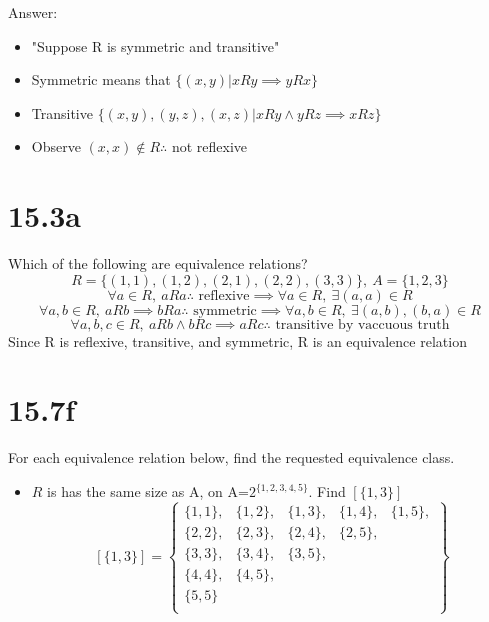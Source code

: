\documentclass[11pt]{article}
\theoremstyle{plain}
\begin{document}
Answer:
\begin{itemize}
    \item "Suppose R is symmetric and transitive"
    \item Symmetric means that $\{(x,y) | xRy \implies yRx\}$ 
    \item Transitive $\{(x,y), (y,z), (x,z) | xRy \land yRz \implies xRz\}$
    \item Observe $(x,x) \not\in R \therefore$ not reflexive
\end{itemize}

\section{15.3a}
Which of the following are equivalence relations?
$$R = \{(1,1),(1,2),(2,1),(2,2),(3,3)\}, ~A = \{1,2,3\}$$
    $$\forall a \in R, ~aRa \therefore \text{ reflexive} \implies \forall a \in R, ~\exists (a,a) \in R $$
    $$\forall a,b \in R, ~aRb \implies bRa \therefore \text{ symmetric} \implies \forall a,b \in R, ~\exists (a,b),(b,a) \in R$$
    $$\forall a,b,c \in R, ~aRb \land bRc \implies aRc \therefore \text{ transitive by vaccuous truth}$$
Since R is reflexive, transitive, and symmetric, R is an equivalence relation

\section{15.7f}
For each equivalence relation below, find the requested equivalence class. 
\begin{itemize}
    \item $R$ is has the same size as A, on A=$2^{\{1,2,3,4,5\}}$. Find $[\{1,3\}]$
    $$ [\{1,3\}] = 
    \left\{\begin{array}{cccccc}
    \{1,1\}, & \{1,2\}, & \{1,3\}, & \{1,4\}, & \{1,5\}, \\
    \{2,2\}, & \{2,3\}, & \{2,4\}, & \{2,5\}, \\
    \{3,3\}, & \{3,4\}, & \{3,5\}, \\
    \{4,4\}, & \{4,5\}, \\
    \{5,5\} \\
    \end{array}\right\}
    $$
\end{itemize}
\end{document}
